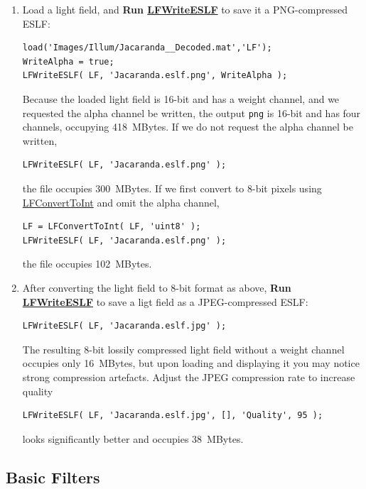 \documentclass[onecolumn]{article}
\newcommand{\CiteFunc}[1]{\hyperlink{#1}{\small #1}}
\newcommand{\SymbolText}[1]{\texttt{\small #1}}
\begin{document}
\begin{enumerate}[leftmargin=1.5em,rightmargin=0.5cm]
\item Load a light field, and \textbf{Run \CiteFunc{LFWriteESLF}} to save it a PNG-compressed ESLF:
\begin{Verbatim}
load('Images/Illum/Jacaranda__Decoded.mat','LF');
WriteAlpha = true;
LFWriteESLF( LF, 'Jacaranda.eslf.png', WriteAlpha );
\end{Verbatim}
Because the loaded light field is 16-bit and has a weight channel, and we requested the alpha channel be written, the output \SymbolText{png} is 16-bit and has four channels, occupying 418~MBytes. If we do not request the alpha channel be written, 
\begin{Verbatim}
LFWriteESLF( LF, 'Jacaranda.eslf.png' );
\end{Verbatim}
the file occupies 300~MBytes. If we first convert to 8-bit pixels using \CiteFunc{LFConvertToInt} and omit the alpha channel, 
\begin{Verbatim}
LF = LFConvertToInt( LF, 'uint8' );
LFWriteESLF( LF, 'Jacaranda.eslf.png' );
\end{Verbatim}
the file occupies 102~MBytes. 

\item After converting the light field to 8-bit format as above, \textbf{Run \CiteFunc{LFWriteESLF}} to save a ligt field as a JPEG-compressed ESLF:
\begin{Verbatim}
LFWriteESLF( LF, 'Jacaranda.eslf.jpg' );
\end{Verbatim}
The resulting 8-bit lossily compressed light field without a weight channel occupies only 16~MBytes, but upon loading and displaying it you may notice strong compression artefacts. Adjust the JPEG compression rate to increase quality
\begin{Verbatim}
LFWriteESLF( LF, 'Jacaranda.eslf.jpg', [], 'Quality', 95 );
\end{Verbatim}
looks significantly better and occupies 38~MBytes.
\end{enumerate}

\subsection{Basic Filters}
\end{document}
